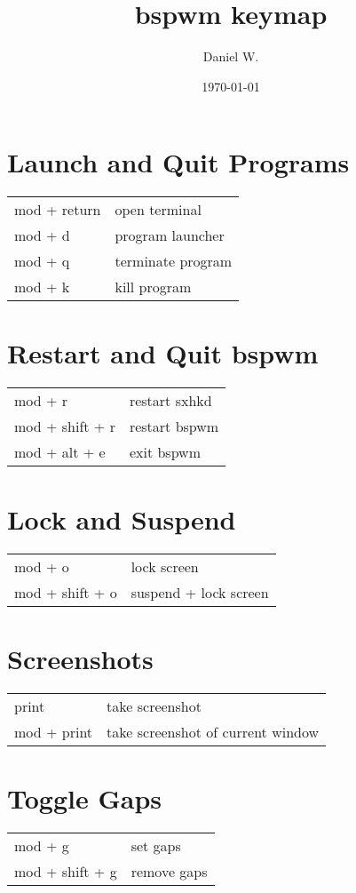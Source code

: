 \documentclass[
    a4paper,
    10pt,
    notitlepage,
    egregdoesnotlikesansseriftitles
]{scrartcl}
\title{bspwm keymap}
\author{Daniel W.}
\date{\today}
\begin{document}
\maketitle

\section{Launch and Quit Programs}
\begin{tabular}{p{4cm}l}
    mod + return        & open terminal                         \\
    mod + d             & program launcher                      \\
    mod + q             & terminate program                     \\
    mod + k             & kill program
\end{tabular}

\section{Restart and Quit bspwm}
\begin{tabular}{p{4cm}l}
    mod + r             & restart sxhkd                         \\
    mod + shift + r     & restart bspwm                         \\
    mod + alt + e       & exit bspwm
\end{tabular}

\section{Lock and Suspend}
\begin{tabular}{p{4cm}l}
    mod + o             & lock screen                           \\
    mod + shift + o     & suspend + lock screen
\end{tabular}

\section{Screenshots}
\begin{tabular}{p{4cm}l}
    print               & take screenshot                       \\
    mod + print         & take screenshot of current window
\end{tabular}

\section{Toggle Gaps}
\begin{tabular}{p{4cm}l}
    mod + g             & set gaps                              \\
    mod + shift + g     & remove gaps
\end{tabular}
\end{document}
